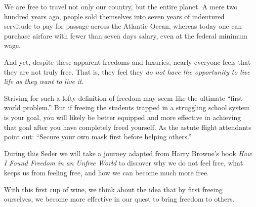 {  We are free to travel not only our country, but the entire planet. A mere two
  hundred years ago, people sold themselves into seven years of indentured
  servitude to pay for passage across the Atlantic Ocean, whereas today one can
  purchase airfare with fewer than seven days salary, even at the federal
  minimum wage.

  \newReading And yet, despite these apparent freedoms and luxuries, nearly
  everyone feels that they are not truly free. That is, they feel they
  \textit{do not have the opportunity to live life as they want to live it}.

  Striving for such a lofty definition of freedom may seem like the ultimate
  ``first world problem.'' But if freeing the students trapped in a struggling
  school system is your goal, you will likely be better equipped and more
  effective in achieving that goal after you have completely freed yourself. As
  the astute flight attendants point out: ``Secure your own mask first before
  helping others.''

  During this Seder we will take a journey adapted from Harry Browne's book \textit{How
  I Found Freedom in an Unfree World} to discover why we do not feel free, what
  keeps us from feeling free, and how we can become much more free.

  With this first cup of wine, we think about the idea that by first freeing
  ourselves, we become more effective in our quest to bring freedom to others.
}

